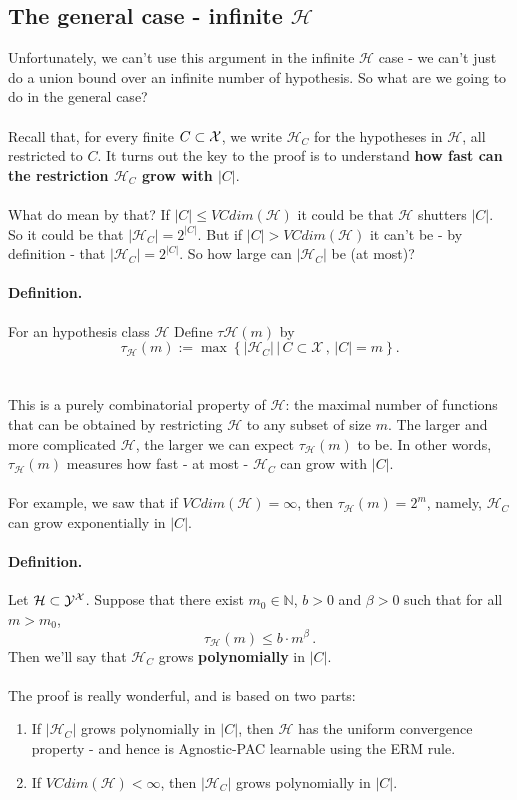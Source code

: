 \documentclass[11pt]{article}
\newcommand{\Xc}{\mathcal{X}}
\newcommand{\Hc}{\mathcal{H}}
\begin{document}
\subsection{The general case - infinite $\Hc$}
Unfortunately, we can't use this argument in the infinite $\Hc$ case - we can't
just do a union bound over an infinite number of hypothesis.
So what are we going to do in the general case? 
\\~\\
Recall that, for every finite $C\subset \mathcal{X}$, we write $\Hc_C$ for the
hypotheses in $\Hc$, all restricted to $C$. 
It turns out the key to the proof is to understand {\bf how fast can the
restriction $\Hc_C$ grow with $|C|$}. 
\\~\\
What do mean by that? If 
$|C|\leq VCdim(\Hc)$ it could be that $\Hc$ shutters $|C|$. So it could be that
$|\Hc_C|=2^{|C|}$. But if $|C| >  VCdim(\Hc)$ it can't be - by definition - that 
$|\Hc_C|=2^{|C|}$. So how large can $|\Hc_C|$ be (at most)?
%
\paragraph{Definition.}
    For an hypothesis class $\Hc$ Define $\tau\Hc(m)$ by
    \[
        \tau_\Hc(m) := \max\left\{ |\Hc_C| \, \Big|\, C\subset \Xc \,,\, |C|=m
        \right\}.
    \]
\\~\\
This is a purely combinatorial property of $\Hc$: the maximal number of functions that can
be obtained by restricting $\Hc$ to any subset of size $m$. The larger and more
complicated $\Hc$, the larger we can expect $\tau_\Hc(m)$ to be. 
In other words, $\tau_\Hc(m)$  measures how fast - at
most -
$\Hc_C$ can grow with $|C|$.
\\~\\
For example, we saw that if $VCdim(\Hc)=\infty$, then  $\tau_\Hc(m)=2^m$,
namely, $\Hc_C$ can grow
exponentially in $|C|$.

%
\paragraph{Definition.}
  Let $\Hc\subset\Y^\X$. 
  Suppose that there exist $m_0\in\mathbb{N}$, $b>0$ and $\beta>0$ such that for
  all $m>m_0$,
  \[
    \tau_\Hc(m) \leq b\cdot m^\beta\,.
  \]
  Then we'll say that $\Hc_C$ grows {\bf polynomially} in
  $|C|$.
\\~\\
%
The proof is really wonderful, and is based on two parts:
\begin{enumerate}
  \item  If 
    $|\Hc_C|$ grows polynomially in $|C|$, then
 $\Hc$ has the uniform convergence property - and hence
 is Agnostic-PAC learnable using the ERM rule.
 \item If $VCdim(\Hc)<\infty$, then
  $|\Hc_C|$ grows polynomially in $|C|$.
\end{enumerate}
\end{document}
